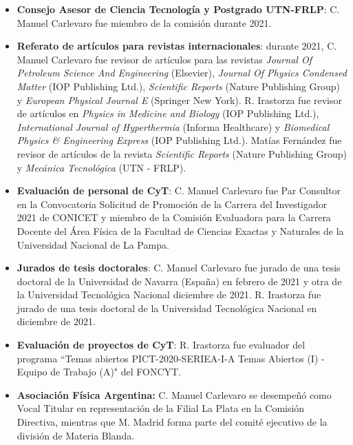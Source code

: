 \documentclass[a4paper,11pt,twoside,final,titlepage,onecolumn,openright]{report}
\begin{document}
\begin{itemize}
  \item \textbf{Consejo Asesor de Ciencia Tecnología y Postgrado UTN-FRLP}: C. Manuel Carlevaro fue miembro de la comisión durante 2021. 
  
 \item \textbf{Referato de artículos para revistas internacionales}: durante 2021, C. Manuel Carlevaro fue revisor de artículos para las revistas \textit{Journal Of Petroleum Science And Engineering} (Elsevier), \textit{Journal Of Physics Condensed Matter} (IOP Publishing Ltd.), \textit{Scientific Reports} (Nature Publishing Group) y \textit{European Physical Journal E} (Springer New York). R. Irastorza fue revisor de artículos en \textit{Physics in Medicine and Biology} (IOP Publishing Ltd.), \textit{International Journal of Hyperthermia} (Informa Healthcare) y \textit{Biomedical Physics \& Engineering Express} (IOP Publishing Ltd.). Matías Fernández fue revisor de artículos de la revista \textit{Scientific Reports} (Nature Publishing Group) y \textit{Mecánica Tecnológica} (UTN - FRLP).
 
 \item \textbf{Evaluación de personal de CyT}: C. Manuel Carlevaro fue Par Consultor en la Convocatoria Solicitud de Promoción de la Carrera del Investigador 2021 de CONICET y miembro de la Comisión Evaluadora para la Carrera Docente del Área Física de la Facultad de Ciencias Exactas y Naturales de la Universidad Nacional de La Pampa.

\item \textbf{Jurados de tesis doctorales}: C. Manuel Carlevaro fue jurado de una tesis doctoral de la Universidad de Navarra (España) en febrero de 2021 y otra de la Universidad Tecnológica Nacional diciembre de 2021. R. Irastorza fue jurado de una tesis doctoral de la Universidad Tecnológica Nacional en diciembre de 2021.

\item \textbf{Evaluación de proyectos de CyT}: R. Irastorza fue evaluador del programa ``Temas abiertos PICT-2020-SERIEA-I-A Temas Abiertos (I) - Equipo de Trabajo (A)"{}  del FONCYT.
 
\item \textbf{Asociación Física Argentina:} C. Manuel Carlevaro se desempeñó como Vocal Titular en representación de la Filial La Plata en la Comisión Directiva, mientras que M. Madrid forma parte del comité ejecutivo de la división de Materia Blanda.
 
\end{itemize}
\end{document}
